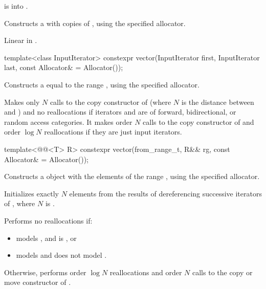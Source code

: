 \begin{itemdescr}
\pnum
\expects
{} is
 into .

\pnum
\effects
Constructs a  with 
copies of , using the specified allocator.

\pnum
\complexity
Linear in .
\end{itemdescr}

\begin{itemdecl}
template<class InputIterator>
  constexpr vector(InputIterator first, InputIterator last,
                   const Allocator& = Allocator());
\end{itemdecl}

\begin{itemdescr}
\pnum
\effects
Constructs a  equal to the
range , using the specified allocator.

\pnum
\complexity
Makes only $N$
calls to the copy constructor of
(where $N$
is the distance between
and
)
and no reallocations if iterators  and  are of forward, bidirectional, or random access categories.
It makes order
$N$
calls to the copy constructor of
and order
$\log N$
reallocations if they are just input iterators.
\end{itemdescr}

%
\begin{itemdecl}
template<@@<T> R>
  constexpr vector(from_range_t, R&& rg, const Allocator& = Allocator());
\end{itemdecl}

\begin{itemdescr}
\pnum
\effects
Constructs a  object with the elements of the range ,
using the specified allocator.

\pnum
\complexity
Initializes exactly $N$ elements
from the results of dereferencing successive iterators of ,
where $N$ is .

\pnum
Performs no reallocations if:
\begin{itemize}
\item
{} models , and
 is , or
\item
{} models  and
 does not model .
\end{itemize}
Otherwise, performs order $\log N$ reallocations and
order $N$ calls to the copy or move constructor of .
\end{itemdescr}

